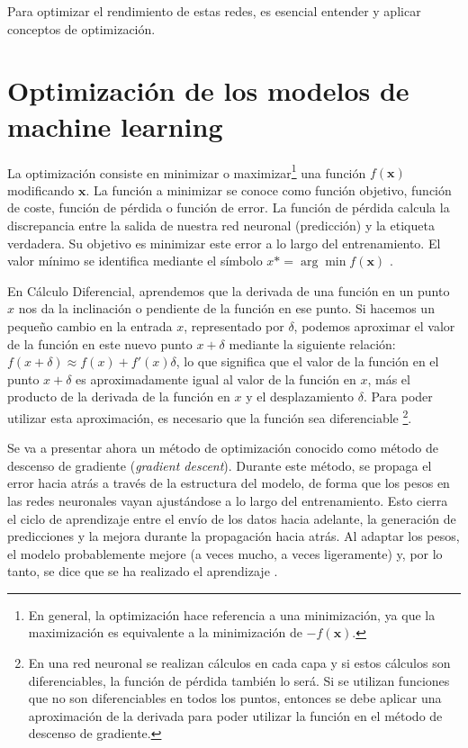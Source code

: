 Para optimizar el rendimiento de estas redes, es esencial entender y aplicar conceptos de optimización.


\section{Optimización de los modelos de machine learning} 

La optimización consiste en minimizar o maximizar\footnote{En general, la optimización hace referencia a una minimización, ya que la maximización es equivalente a la minimización de $-f(\mathbf{x})$.} una función $f(\mathbf{x})$ modificando $\mathbf{x}$. La función a minimizar se conoce como función objetivo, función de coste, función de pérdida o función de error. La función de pérdida calcula la discrepancia entre la salida de nuestra red neuronal (predicción) y la etiqueta verdadera. Su objetivo es minimizar este error a lo largo del entrenamiento. El valor mínimo se identifica mediante el símbolo $x* = \arg \min f(\mathbf{x})$ \citep{pajares2021aprendizaje}. 

En Cálculo Diferencial, aprendemos que la derivada de una función en un punto $x$ nos da la inclinación o pendiente de la función en ese punto. Si hacemos un pequeño cambio en la entrada $x$, representado por $\delta$, podemos aproximar el valor de la función en este nuevo punto $x + \delta$ mediante la siguiente relación: $f(x + \delta) \approx f(x) + f'(x)\delta$, lo que significa que el valor de la función en el punto $x + \delta$ es aproximadamente igual al valor de la función en $x$, más el producto de la derivada de la función en $x$ y el desplazamiento $\delta$. Para poder utilizar esta aproximación, es necesario que la función sea diferenciable \footnote{En una red neuronal se realizan cálculos en cada capa y si estos cálculos son diferenciables, la función de pérdida también lo será. Si se utilizan funciones que no son diferenciables en todos los puntos,  entonces se debe aplicar una aproximación de la derivada para poder utilizar la función en el método de descenso de gradiente.}. 


Se va a presentar ahora un método de optimización conocido como método de descenso de gradiente (\textit{gradient descent}). Durante este método, se propaga el error hacia atrás a través de la estructura del modelo, de forma que los pesos en las redes neuronales vayan ajustándose a lo largo del entrenamiento. Esto cierra el ciclo de aprendizaje entre el envío de los datos hacia adelante, la generación de predicciones y la mejora durante la propagación hacia atrás. Al adaptar los pesos, el modelo probablemente mejore (a veces mucho, a veces ligeramente) y, por lo tanto, se dice que se ha realizado el aprendizaje \citep{pajares2021aprendizaje}. 


